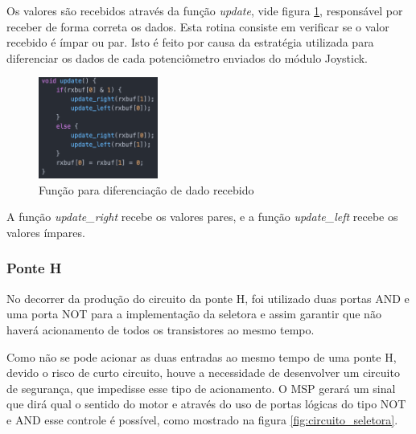 			Os valores são recebidos através da função \textit{update}, vide figura \ref{fig:update}, responsável por receber de forma correta os dados. Esta rotina consiste em verificar se o valor recebido é ímpar ou par. Isto é feito por causa da estratégia utilizada para diferenciar os dados de cada potenciômetro enviados do módulo Joystick.

			\begin{figure}[!htb]
				\centering
				\includegraphics[width = 0.35\textwidth]{figuras/resultados/update}
				\caption{Função para diferenciação de dado recebido}
				\label{fig:update}
			\end{figure}

			A função \textit{update\_right} recebe os valores pares, e a função \textit{update\_left} recebe os valores ímpares.

		\subsubsection{Ponte H}

			No decorrer da produção do circuito da ponte H, foi utilizado duas portas AND e uma porta NOT para a implementação da seletora e assim garantir que não haverá acionamento de todos os transistores ao mesmo tempo.

			Como não se pode acionar as duas entradas ao mesmo tempo de uma ponte H, devido o risco de curto circuito, houve a necessidade de desenvolver um circuito de segurança, que impedisse esse tipo de acionamento. O MSP gerará um sinal que dirá qual o sentido do motor e através do uso de portas lógicas do tipo NOT e AND esse controle é possível, como mostrado na figura \ref{fig:circuito_seletora}.

